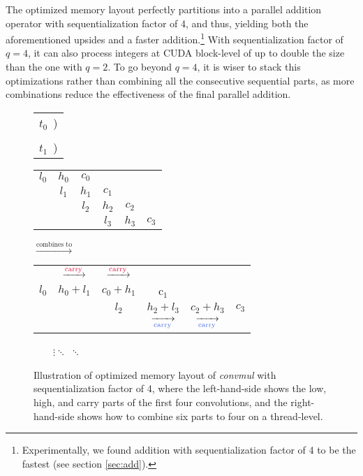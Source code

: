 The optimized memory layout perfectly partitions into a parallel addition
operator with sequentialization factor of 4, and thus, yielding both the
aforementioned upsides and a faster addition.\footnote{Experimentally, we found
  addition with sequentialization factor of 4 to be the fastest (see section
  \ref{sec:add}).}  With sequentialization factor of $q=4$, it can also process
integers at CUDA block-level of up to double the size than the one with
$q=2$. To go beyond $q=4$, it is wiser to stack this optimizations rather than
combining all the consecutive sequential parts, as more combinations reduce the
effectiveness of the final parallel addition.



\begin{figure}
  \begin{center}
  \small
  \begin{tabular}{C{0.5cm}}
  \Large{\color{Crimson} $t_0$}~)\\\\
    \Large{\color{RoyalBlue} $t_1$}~)
\end{tabular}
  \begin{tabular}{cccccc}
    \color{Crimson}$l_0$ & \color{Crimson}$h_0$ & \color{Crimson}$c_0$ & & & \\
    & \color{Crimson}$l_1$ & \color{Crimson}$h_1$ & \color{Crimson}$c_1$ & & \\
    & & \color{RoyalBlue}$l_2$ & \color{RoyalBlue}$h_2$ & \color{RoyalBlue}$c_2$ & \\
    & & & \color{RoyalBlue}$l_3$ & \color{RoyalBlue}$h_3$ & \color{RoyalBlue}$c_3$
  \end{tabular}
$\xrightarrow{\text{combines to}}$
\begin{tabular}{cccccc}
     & $\xrightarrow{\scriptsize \text{\color{Crimson}carry}}$ & $\xrightarrow{\scriptsize \text{\color{Crimson}carry}}$ &  &  &  \\
    \color{Crimson}$l_0$ & \color{Crimson}$h_0 + l_1$ & \color{Crimson}$c_0 + h_1$ & \color{Crimson}c$_1$ & & \\
    & & \color{RoyalBlue}$l_2$ & \color{RoyalBlue}$h_2+l_3$ & \color{RoyalBlue}$c_2+h_3$ & \color{RoyalBlue} $c_3$\\
  & & & $\xrightarrow[\scriptsize \text{\color{RoyalBlue}carry}]{}$ & $\xrightarrow[\scriptsize \text{\color{RoyalBlue}carry}]{}$ & \\
\end{tabular}
\end{center}
~~~~$\vdots$\qquad\qquad\qquad\qquad\qquad $\ddots$ \qquad\qquad\qquad\qquad\qquad\qquad\qquad\qquad\qquad\qquad\qquad\qquad  $\ddots$
\caption{\footnotesize Illustration of optimized memory layout of
  \textit{convmul} with sequentialization factor of 4, where the left-hand-side
  shows the low, high, and carry parts of the first four convolutions, and the
  right-hand-side shows how to combine six parts to four on a thread-level.}
  \label{fig:muloptmem}
\end{figure}

